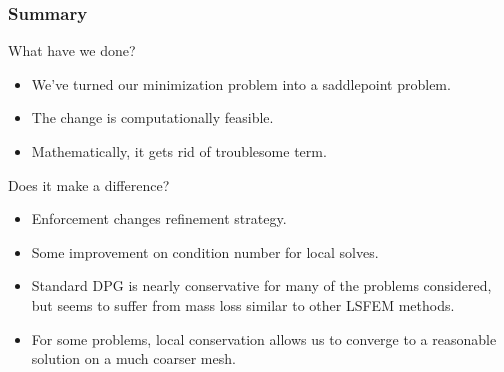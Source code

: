 \documentclass{beamer}
\newcommand{\pecosbold}[1]{{\color{pecos2}{#1}}}
\begin{document}
\begin{frame}
\frametitle{Summary}
What have we done?
\begin{itemize}
\item We've turned our minimization problem into a saddlepoint problem.
\item The change is computationally feasible.
\item Mathematically, it gets rid of troublesome term.
\end{itemize}

\vspace{2ex}
Does it make a difference?
\begin{itemize}
\item Enforcement changes refinement strategy.
\item Some improvement on condition number for local solves.
\item Standard DPG is nearly conservative for many of the problems considered,
  but seems to suffer from mass loss similar to other LSFEM methods.
\item For some problems, local conservation allows us to converge to a
  reasonable solution on a much coarser mesh.
\end{itemize}
\end{frame}



{\scriptsize

}
\end{document}
